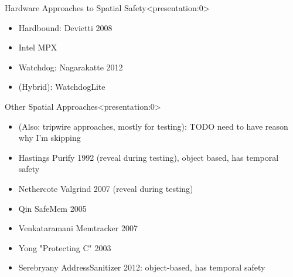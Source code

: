 \documentclass[aspectratio=169]{beamer}
\begin{document}

\begin{frame}{Hardware Approaches to Spatial Safety}<presentation:0>
    \begin{itemize}
       \item Hardbound: Devietti 2008
       \item Intel MPX %
       \item Watchdog: Nagarakatte 2012
       \item (Hybrid): WatchdogLite
    \end{itemize}
\end{frame}

\begin{frame}{Other Spatial Approaches}<presentation:0>
\begin{itemize}
 \item (Also: tripwire approaches, mostly for testing): TODO need to have reason why I'm skipping
 \item Hastings Purify 1992 (reveal during testing), object based, has temporal safety
 \item Nethercote Valgrind 2007 (reveal during testing)
 \item Qin SafeMem 2005
 \item Venkataramani Memtracker 2007
 \item Yong "Protecting C" 2003
 \item Serebryany AddressSanitizer 2012: object-based, has temporal safety
\end{itemize}
\end{frame}
\end{document}
